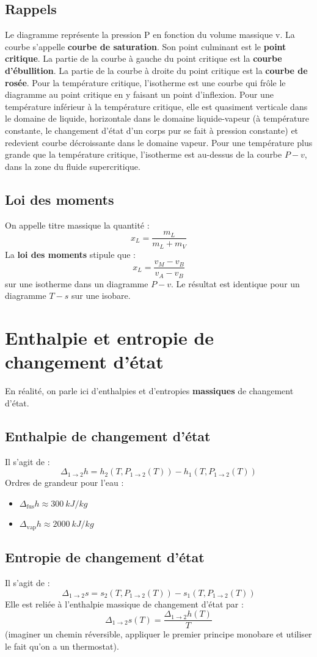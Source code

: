 \documentclass[french]{book}
\theoremstyle{plain}
\theoremstyle{definition}
\theoremstyle{remark}
\begin{document}
\subsection{Rappels}
Le diagramme représente la pression P en fonction du volume massique v. La courbe s'appelle \textbf{courbe de saturation}. Son point culminant est le \textbf{point critique}. La partie de la courbe à gauche du point critique est la \textbf{courbe d'ébullition}. La partie de la courbe à droite du point critique est la \textbf{courbe de rosée}. Pour la température critique, l'isotherme est une courbe qui frôle le diagramme au point critique en y faisant un point d'inflexion. Pour une température inférieur à la température critique, elle est quasiment verticale dans le domaine de liquide, horizontale dans le domaine liquide-vapeur (à température constante, le changement d'état d'un corps pur se fait à pression constante) et redevient courbe décroissante dans le domaine vapeur. Pour une température plus grande que la température critique, l'isotherme est au-dessus de la courbe $P-v$, dans la zone du fluide supercritique.
\subsection{Loi des moments}
On appelle titre massique la quantité : $$x_L=\frac{m_L}{m_L+m_V}$$
La \textbf{loi des moments} stipule que : $$x_L=\frac{v_M-v_B}{v_A-v_B}$$ sur une isotherme dans un diagramme $P-v$. Le résultat est identique pour un diagramme $T-s$ sur une isobare.
\section{Enthalpie et entropie de changement d'état}
En réalité, on parle ici d'enthalpies et d'entropies \textbf{massiques} de changement d'état.
\subsection{Enthalpie de changement d'état}
Il s'agit de : $$\Delta_{1\to2}h=h_2(T,P_{1\to2}(T))-h_1(T,P_{1\to2}(T))$$ Ordres de grandeur pour l'eau : \begin{itemize}
	\item $\Delta_{\text{fus}}h\approx 300\ kJ/kg$
	\item $\Delta_{\text{vap}}h\approx 2000\ kJ/kg$
\end{itemize}
\subsection{Entropie de changement d'état}
Il s'agit de : $$\Delta_{1\to2}s=s_2(T,P_{1\to2}(T))-s_1(T,P_{1\to2}(T))$$ Elle est reliée à l'enthalpie massique de changement d'état par : $$\Delta_{1\to2}s(T)=\frac{\Delta_{1\to2}h(T)}{T}$$ (imaginer un chemin réversible, appliquer le premier principe monobare et utiliser le fait qu'on a un thermostat).
\end{document}
